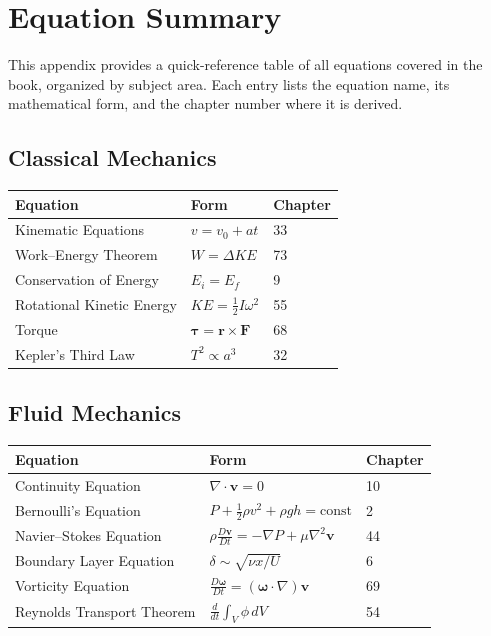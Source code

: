 \chapter{Equation Summary}

This appendix provides a quick-reference table of all equations covered in the book, organized by subject area. Each entry lists the equation name, its mathematical form, and the chapter number where it is derived.

\section*{Classical Mechanics}

\begin{center}
\begin{tabular}{lll}
\hline
\textbf{Equation} & \textbf{Form} & \textbf{Chapter} \\
\hline
Kinematic Equations & $v = v_0 + at$ & 33 \\
Work--Energy Theorem & $W = \Delta KE$ & 73 \\
Conservation of Energy & $E_i = E_f$ & 9 \\
Rotational Kinetic Energy & $KE = \frac{1}{2}I\omega^2$ & 55 \\
Torque & $\boldsymbol{\tau} = \mathbf{r} \times \mathbf{F}$ & 68 \\
Kepler's Third Law & $T^2 \propto a^3$ & 32 \\
\hline
\end{tabular}
\end{center}

\section*{Fluid Mechanics}

\begin{center}
\begin{tabular}{lll}
\hline
\textbf{Equation} & \textbf{Form} & \textbf{Chapter} \\
\hline
Continuity Equation & $\nabla \cdot \mathbf{v} = 0$ & 10 \\
Bernoulli's Equation & $P + \frac{1}{2}\rho v^2 + \rho gh = \text{const}$ & 2 \\
Navier--Stokes Equation & $\rho \frac{D\mathbf{v}}{Dt} = -\nabla P + \mu \nabla^2 \mathbf{v}$ & 44 \\
Boundary Layer Equation & $\delta \sim \sqrt{\nu x/U}$ & 6 \\
Vorticity Equation & $\frac{D\boldsymbol{\omega}}{Dt} = (\boldsymbol{\omega} \cdot \nabla)\mathbf{v}$ & 69 \\
Reynolds Transport Theorem & $\frac{d}{dt}\int_V \phi \, dV$ & 54 \\
\hline
\end{tabular}
\end{center}

